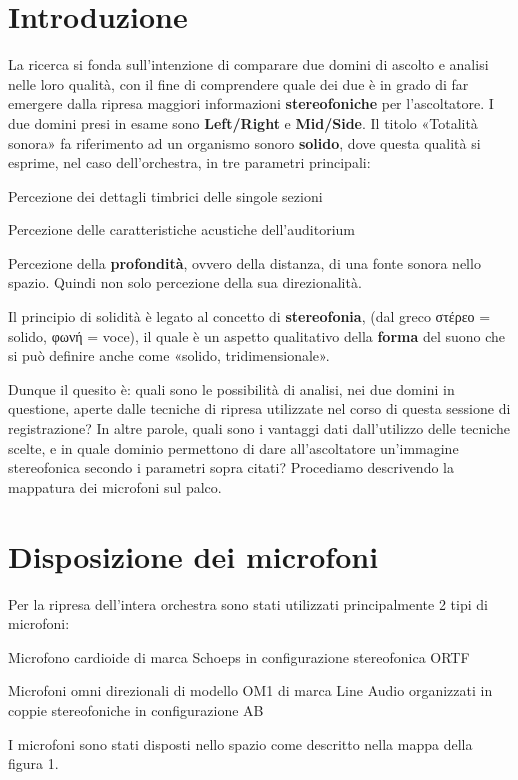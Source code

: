 \section*{Introduzione}
La ricerca si fonda sull'intenzione di comparare due domini di ascolto e analisi nelle loro qualità, con il fine di comprendere quale dei due è in grado di far emergere dalla ripresa maggiori informazioni \textbf{stereofoniche} per l'ascoltatore.
I due domini presi in esame sono \textbf{Left/Right} e \textbf{Mid/Side}.
Il titolo «Totalità sonora» fa riferimento ad un organismo sonoro \textbf{solido}, dove questa qualità si esprime, nel caso dell'orchestra, in tre parametri principali:
\begin{compactitem} 
	\item Percezione dei dettagli timbrici delle singole sezioni
	\item Percezione delle caratteristiche  acustiche  dell'auditorium
	\item Percezione della \textbf{profondità}, ovvero della distanza, di una fonte sonora nello spazio. Quindi non solo percezione della sua direzionalità.
	\end{compactitem}
Il principio di solidità è legato al concetto di \textbf{stereofonia}, (dal greco στέρεο = solido, φωνή = voce), il quale è un aspetto qualitativo della \textbf{forma} del suono che si può definire anche come «solido, tridimensionale».

Dunque il quesito è: quali sono le possibilità di analisi, nei due domini in questione, aperte dalle tecniche di ripresa utilizzate nel corso di questa sessione di registrazione?
In altre parole, quali sono i vantaggi dati dall'utilizzo delle tecniche scelte, e in quale dominio permettono di dare all'ascoltatore un'immagine stereofonica secondo i parametri sopra citati?
Procediamo descrivendo la mappatura dei microfoni sul palco.

\section*{Disposizione dei microfoni}
Per la ripresa dell'intera orchestra sono stati utilizzati principalmente 2 tipi di microfoni:
\begin{compactitem} 
\item Microfono cardioide di marca Schoeps in configurazione stereofonica ORTF
\item Microfoni omni direzionali di modello OM1 di marca Line Audio organizzati in coppie stereofoniche in configurazione AB
\end{compactitem}
I microfoni sono stati disposti nello spazio come descritto nella mappa della figura 1.

